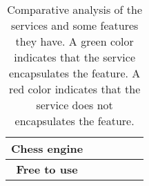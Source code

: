 \begin{table}[h]
{\begin{tabular}{clllll}
            \rowcolor[HTML]{FD6864}
            \cellcolor[HTML]{EFEFEF}\textbf{Chess engine}                            & \multicolumn{1}{l}{\cellcolor[HTML]{67FD9A}}                   & \multicolumn{1}{l}{\cellcolor[HTML]{67FD9A}}                     & \multicolumn{1}{l}{\cellcolor[HTML]{FD6864}}                   & \multicolumn{1}{l}{\cellcolor[HTML]{FD6864}}                        &                                                                    \\ \midrule
            \rowcolor[HTML]{67FD9A}
            \cellcolor[HTML]{EFEFEF}\textbf{Free to use}                             & \multicolumn{1}{l}{\cellcolor[HTML]{67FD9A}}                   & \multicolumn{1}{l}{\cellcolor[HTML]{67FD9A}}                     & \multicolumn{1}{l}{\cellcolor[HTML]{67FD9A}}                   & \multicolumn{1}{l}{\cellcolor[HTML]{FD6864}}                        &                                                                    \\ \bottomrule
        \end{tabular}%
    }
    \caption{Comparative analysis of the services and some features they have.
    A green color indicates that the service encapsulates the feature.
    A red color indicates that the service does not encapsulates the feature.}\label{tab:comparative-analysis}
\end{table}
